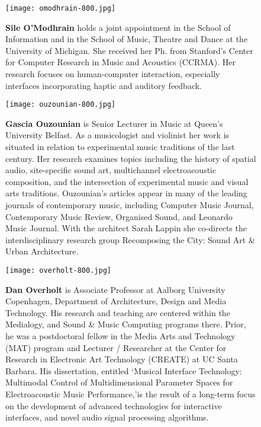 \begin{authbio}
\begin{figure}[H]
  \sidecaption[t]
  \texttt{[image: omodhrain-800.jpg]}
  \caption{\textbf{Sile O'Modhrain} holds a joint appointment in the School of Information and in the School of Music, Theatre and Dance at the University of Michigan. She received her Ph. from Stanford's Center for Computer Research in Music and Acoustics (CCRMA). Her research focuses on human-computer interaction, especially interfaces incorporating haptic and auditory feedback.}
\end{figure}

\begin{figure}[H]
  \sidecaption[t]
  \texttt{[image: ouzounian-800.jpg]}
  \caption{\textbf{Gascia Ouzounian} is Senior Lecturer in Music at Queen's University Belfast. As a musicologist and violinist her work is situated in relation to experimental music traditions of the last century. Her research examines topics including the history of spatial audio, site-specific sound art, multichannel electroacoustic composition, and the intersection of experimental music and visual arts traditions. Ouzounian's articles appear in many of the leading journals of contemporary music, including Computer Music Journal, Contemporary Music Review, Organised Sound, and Leonardo Music Journal. With the architect Sarah Lappin she co-directs the interdisciplinary research group Recomposing the City: Sound Art \& Urban Architecture.}
\end{figure}

\begin{figure}[H]
 \sidecaption[t]
 \texttt{[image: overholt-800.jpg]}
 \caption{\textbf{Dan Overholt} is Associate Professor at Aalborg University Copenhagen, Department of Architecture, Design and Media Technology. His research and teaching are centered within the Medialogy, and Sound \& Music Computing programs there. Prior, he was a postdoctoral fellow in the Media Arts and Technology (MAT) program and Lecturer / Researcher at the Center for Research in Electronic Art Technology (CREATE) at UC Santa Barbara. His dissertation, entitled \lq Musical Interface Technology: Multimodal Control of Multidimensional Parameter Spaces for Electroacoustic Music Performance,\rq is the result of a long-term focus on the development of advanced technologies for interactive interfaces, and novel audio signal processing algorithms.}
\end{figure}


\end{authbio}
